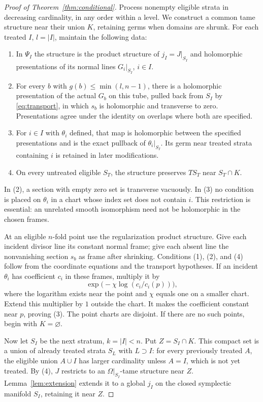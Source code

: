 \documentclass[11pt]{article}
\theoremstyle{definition}
\theoremstyle{remark}
\begin{document}
\begin{proof}[Proof of Theorem~\ref{thm:conditional}]
Process nonempty eligible strata in decreasing cardinality, in any order within a level. We construct a common tame structure near their union $K$, retaining germs when domains are shrunk. For each treated $I$, $l=|I|$, maintain the following data:
\begin{enumerate}[label=(\arabic*),leftmargin=*]
\item In $\Psi_I$ the structure is the product structure of $j_I=J|_{S_I}$ and holomorphic presentations of its normal lines $G_i|_{S_I}$, $i\in I$.
\item For every $b$ with $g(b)\leq\min(l,n-1)$, there is a holomorphic presentation of the actual $G_b$ on this tube, pulled back from $S_I$ by \eqref{eq:transport}, in which $s_b$ is holomorphic and transverse to zero. Presentations agree under the identity on overlaps where both are specified.
\item For $i\in I$ with $\theta_i$ defined, that map is holomorphic between the specified presentations and is the exact pullback of $\theta_i|_{S_I}$. Its germ near treated strata containing $i$ is retained in later modifications.
\item On every untreated eligible $S_T$, the structure preserves $TS_T$ near $S_T\cap K$.
\end{enumerate}
In (2), a section with empty zero set is transverse vacuously. In (3) no condition is placed on $\theta_i$ in a chart whose index set does not contain $i$. This restriction is essential: an unrelated smooth isomorphism need not be holomorphic in the chosen frames.

At an eligible $n$-fold point use the regularization product structure. Give each incident divisor line its constant normal frame; give each absent line the nonvanishing section $s_b$ as frame after shrinking. Conditions (1), (2), and (4) follow from the coordinate equations and the transport hypotheses. If an incident $\theta_i$ has coefficient $c_i$ in these frames, multiply it by
\[
 \exp\bigl(-\chi\log(c_i/c_i(p))\bigr),
\]
where the logarithm exists near the point and $\chi$ equals one on a smaller chart. Extend this multiplier by $1$ outside the chart. It makes the coefficient constant near $p$, proving (3). The point charts are disjoint. If there are no such points, begin with $K=\varnothing$.

Now let $S_I$ be the next stratum, $k=|I|<n$. Put $Z=S_I\cap K$. This compact set is a union of already treated strata $S_L$ with $L\supset I$: for every previously treated $A$, the eligible union $A\cup I$ has larger cardinality unless $A=I$, which is not yet treated. By (4), $J$ restricts to an $\Omega|_{S_I}$-tame structure near $Z$. Lemma~\ref{lem:extension} extends it to a global $j_I$ on the closed symplectic manifold $S_I$, retaining it near $Z$.


\end{proof}
\end{document}
